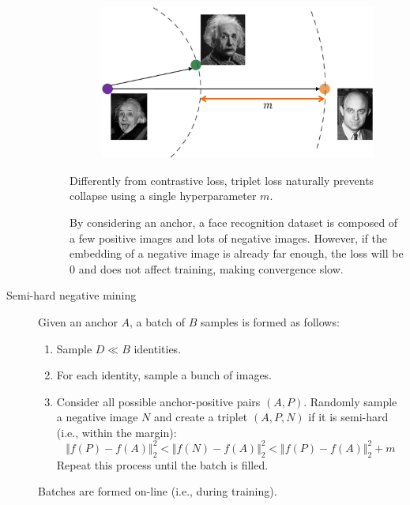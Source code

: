 \begin{description}
\begin{description}
                \begin{figure}[H]
                    \centering
                    \includegraphics[width=0.45\linewidth]{./img/_triplet_loss.jpg}
                \end{figure}

                \begin{remark}
                    Differently from contrastive loss, triplet loss naturally prevents collapse using a single hyperparameter $m$.
                \end{remark}

                \begin{remark}
                    By considering an anchor, a face recognition dataset is composed of a few positive images and lots of negative images. However, if the embedding of a negative image is already far enough, the loss will be $0$ and does not affect training, making convergence slow.
                \end{remark}
        \end{description}

    \item[Semi-hard negative mining] 
        Given an anchor $A$, a batch of $B$ samples is formed as follows:
        \begin{enumerate}
            \item Sample $D \ll B$ identities.
            \item For each identity, sample a bunch of images.
            \item Consider all possible anchor-positive pairs $(A, P)$. Randomly sample a negative image $N$ and create a triplet $(A, P, N)$ if it is semi-hard (i.e., within the margin):
            \[ \Vert f(P) - f(A) \Vert_2^2 < \Vert f(N) - f(A) \Vert_2^2 < \Vert f(P) - f(A) \Vert_2^2 + m \]
            Repeat this process until the batch is filled.
        \end{enumerate}

        \begin{remark}
            Batches are formed on-line (i.e., during training).
        \end{remark}


\end{description}
